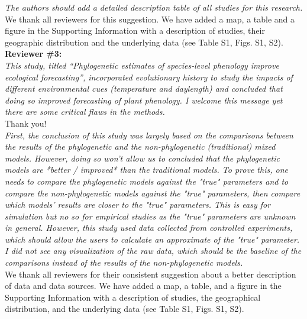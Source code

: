 \documentclass[11pt]{article}
\begin{document}
\emph{The authors should add a detailed description table of all studies for this research.}\\
We thank all reviewers for this suggestion. We have added a map, a table and a figure in the Supporting Information with a description of studies, their geographic distribution and the underlying data (see Table S1, Figs. S1, S2).\\ %



{\bf Reviewer \#3:}\\

\emph{This study, titled “Phylogenetic estimates of species-level phenology improve ecological forecasting”, incorporated evolutionary history to study the impacts of different environmental cues (temperature and daylength) and concluded that doing so improved forecasting of plant phenology. I welcome this message yet there are some critical flaws in the methods.}\\

Thank you!\\

\emph{First, the conclusion of this study was largely based on the comparisons between the results of the phylogenetic and the non-phylogenetic (traditional) mixed models. However, doing so won't allow us to concluded that the phylogenetic models are *better / improved* than the traditional models. To prove this, one needs to compare the phylogenetic models against the "true" parameters and to compare the non-phylogenetic models against the "true" parameters, then compare which models' results are closer to the "true" parameters. This is easy for simulation but no so for empirical studies as the "true" parameters are unknown in general. However, this study used data collected from controlled experiments, which should allow the users to calculate an approximate of the "true" parameter. I did not see any visualization of the raw data, which should be the baseline of the comparisons instead of the results of the non-phylogenetic models.}\\

We thank all reviewers for their consistent suggestion about a better description of data and data sources. We have added a map, a table, and a figure in the Supporting Information with a description of studies, the geographical distribution, and the underlying data (see Table S1, Figs. S1, S2).
\end{document}
